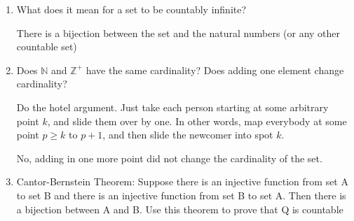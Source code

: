 \question 
\begin{enumerate}[label=(\alph*.)]
\item
What does it mean for a set to be countably infinite? 
\begin{solution}
There is a bijection between the set and the natural numbers (or any other countable set)
\end{solution}

\item
Does $\mathbb{N}$ and $\mathbb{Z}^+$ have the same cardinality? Does adding one element change cardinality?
\begin{solution}
Do the hotel argument. Just take each person starting at some arbitrary point $k$, and slide them over by one. In other words, map everybody at some point $p \ge k$ to $p + 1$, and then slide the newcomer into spot $k$.

No, adding in one more point did not change the cardinality of the set.
\end{solution}
\item
Cantor-Bernstein Theorem: Suppose there is an injective function from set A to set B and there is an injective function from set B to set A. Then there is a bijection between A and B.
Use this theorem to prove that Q is countable

\end{enumerate}